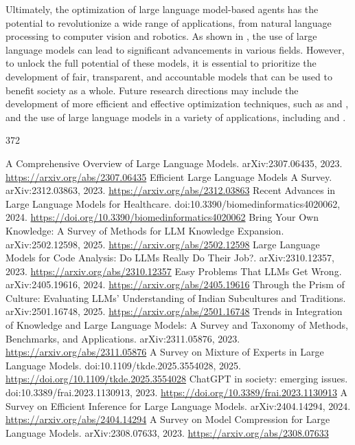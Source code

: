 \documentclass[11pt]{article}
\begin{document}
Ultimately, the optimization of large language model-based agents has the potential to revolutionize a wide range of applications, from natural language processing to computer vision and robotics. As shown in \cite{ref368}, the use of large language models can lead to significant advancements in various fields. However, to unlock the full potential of these models, it is essential to prioritize the development of fair, transparent, and accountable models that can be used to benefit society as a whole. Future research directions may include the development of more efficient and effective optimization techniques, such as \cite{ref369} and \cite{ref370}, and the use of large language models in a variety of applications, including \cite{ref371} and \cite{ref372}.


\begin{thebibliography}{372}
 A Comprehensive Overview of Large Language Models. arXiv:2307.06435, 2023. \url{https://arxiv.org/abs/2307.06435}
 Efficient Large Language Models A Survey. arXiv:2312.03863, 2023. \url{https://arxiv.org/abs/2312.03863}
 Recent Advances in Large Language Models for Healthcare. doi:10.3390/biomedinformatics4020062, 2024. \url{https://doi.org/10.3390/biomedinformatics4020062}
 Bring Your Own Knowledge: A Survey of Methods for LLM Knowledge Expansion. arXiv:2502.12598, 2025. \url{https://arxiv.org/abs/2502.12598}
 Large Language Models for Code Analysis: Do LLMs Really Do Their Job?. arXiv:2310.12357, 2023. \url{https://arxiv.org/abs/2310.12357}
 Easy Problems That LLMs Get Wrong. arXiv:2405.19616, 2024. \url{https://arxiv.org/abs/2405.19616}
 Through the Prism of Culture: Evaluating LLMs' Understanding of Indian Subcultures and Traditions. arXiv:2501.16748, 2025. \url{https://arxiv.org/abs/2501.16748}
 Trends in Integration of Knowledge and Large Language Models: A Survey and Taxonomy of Methods, Benchmarks, and Applications. arXiv:2311.05876, 2023. \url{https://arxiv.org/abs/2311.05876}
 A Survey on Mixture of Experts in Large Language Models. doi:10.1109/tkde.2025.3554028, 2025. \url{https://doi.org/10.1109/tkde.2025.3554028}
 ChatGPT in society: emerging issues. doi:10.3389/frai.2023.1130913, 2023. \url{https://doi.org/10.3389/frai.2023.1130913}
 A Survey on Efficient Inference for Large Language Models. arXiv:2404.14294, 2024. \url{https://arxiv.org/abs/2404.14294}
 A Survey on Model Compression for Large Language Models. arXiv:2308.07633, 2023. \url{https://arxiv.org/abs/2308.07633}

\end{thebibliography}
\end{document}
